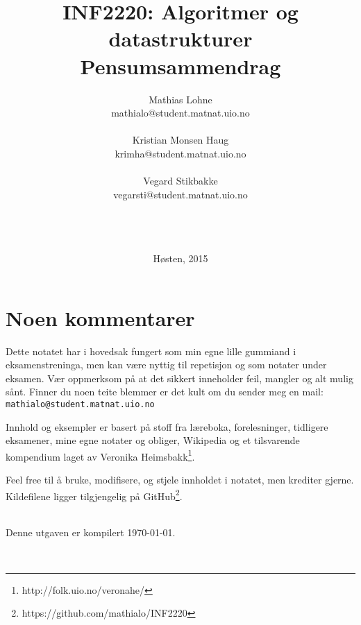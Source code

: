 \documentclass[10pt,norsk,a4paper,hidelinks, twoside]{article}
\title{\sffamily \Huge INF2220: Algoritmer og datastrukturer\\ Pensumsammendrag}
\author{\sffamily Mathias Lohne\\ \footnotesize\sffamily mathialo@student.matnat.uio.no\\~\\\sffamily Kristian Monsen Haug\\ \footnotesize\sffamily krimha@student.matnat.uio.no \\~\\ \sffamily Vegard Stikbakke \\ \footnotesize \footnotesize\sffamily vegarsti@student.matnat.uio.no}
\date{~\\~\\~\\\sffamily Høsten, 2015}
\theoremstyle{indented}
\begin{document}
\maketitle
\thispagestyle{empty}
\vfill
\newpage
{}
\thispagestyle{plain}

\section*{Noen kommentarer}
Dette notatet har i hovedsak fungert som min egne lille gummiand i eksamenstreninga, men kan være nyttig til repetisjon og som notater under eksamen. Vær oppmerksom på at det sikkert inneholder feil, mangler og alt mulig sånt. Finner du noen teite blemmer er det kult om du sender meg en mail: \verb|mathialo@student.matnat.uio.no|

Innhold og eksempler er basert på stoff fra læreboka, forelesninger, tidligere eksamener, mine egne notater og obliger, Wikipedia og et tilsvarende kompendium laget av Veronika Heimsbakk\footnote{http://folk.uio.no/veronahe/}.

Feel free til å bruke, modifisere, og stjele innholdet i notatet, men krediter gjerne. Kildefilene ligger tilgjengelig på GitHub\footnote{https://github.com/mathialo/INF2220}.

~\\Denne utgaven er kompilert \today.

~\\

\newpage
\thispagestyle{plain}

\tableofcontents
\thispagestyle{plain}
\newpage
{}

\newpage
\newpage
\newpage
\newpage

\newpage
\newpage
\newpage



\newpage
\appendix



\end{document}
